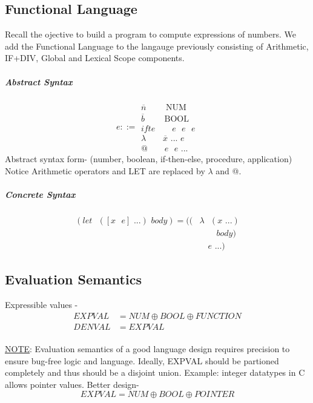 \subsection{Functional Language}
Recall the ojective to build a program to compute expressions of numbers. We add the Functional Language to the langauge previously consisting of Arithmetic, IF+DIV, Global and Lexical Scope components.\\
\subparagraph{Abstract Syntax}
\[
e ::=
\begin{array}{ll}
    \overline{n} \qquad \text{ NUM}\\
    \overline{b} \qquad\text{ BOOL}\\
    ifte \qquad e \text{ } e \text{ } e\\
    \lambda \qquad \overline{x} \text{ ... }e\\    
    @ \qquad e \text{ } e \text{ ...}
\end{array}
\]
\newline
Abstract syntax form- (number, boolean, if-then-else, procedure, application)\newline
Notice Arithmetic operators and LET are replaced by $\lambda$ and @.

\subparagraph{Concrete Syntax}
\begin{align}
(let\text{ }([x\text{ }e]\text{ ...}) \textit{ body}) = ((& \lambda\text{ }(x\text{ ...})\nonumber \\&\qquad \textit{body})\nonumber \\&\quad e\text{ ...}) \nonumber
\end{align}

\subsection{Evaluation Semantics}
Expressible values -\newline
\begin{align}
EXPVAL &= NUM \oplus BOOL \oplus FUNCTION \nonumber \\
DENVAL &= EXPVAL \nonumber
\end{align}
\\\underline{NOTE}: Evaluation semantics of a good language design requires precision to ensure bug-free logic and language. Ideally, EXPVAL should be partioned completely and thus should be a disjoint union.\newline
Example: integer datatypes in C allows pointer values. Better design-
\[EXPVAL = NUM \oplus BOOL \oplus POINTER \]

